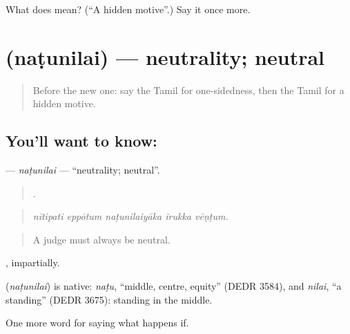 \begin{tcolorbox}[breakable,colback=teal!4,colframe=teal!35!black,title={Before you move on}]
What does  mean? (\textquotedblleft{}A hidden motive\textquotedblright{}.) Say it once more.
\end{tcolorbox}
\section[\texorpdfstring{\ta{நடுநிலை} (naṭunilai)}{நடுநிலை (naṭunilai)}]{ (naṭunilai) — neutrality; neutral}

\label{lesson:TA-C394-natunilai}



\begin{quote}
Before the new one: say the Tamil for one-sidedness, then the Tamil for a hidden motive.
\end{quote}

\subsection*{You'll want to know: }
\textbf{} — \emph{naṭunilai} — \textquotedblleft{}neutrality; neutral\textquotedblright{}.

\begin{quote}
    .
\end{quote}

\begin{quote}
\emph{nītipati eppōtum naṭunilaiyāka irukka vēṇṭum.}
\end{quote}

\begin{quote}
A judge must always be neutral.
\end{quote}

, impartially.

\begin{cousinweb}
\textbf{} (\emph{naṭunilai}) is native: \emph{naṭu}, \textquotedblleft{}middle, centre, equity\textquotedblright{} (DEDR 3584), and \emph{nilai}, \textquotedblleft{}a standing\textquotedblright{} (DEDR 3675): standing in the middle.
\end{cousinweb}

\begin{grammarlens}[title={What you've built}]
One more word for saying what happens if.
\end{grammarlens}

